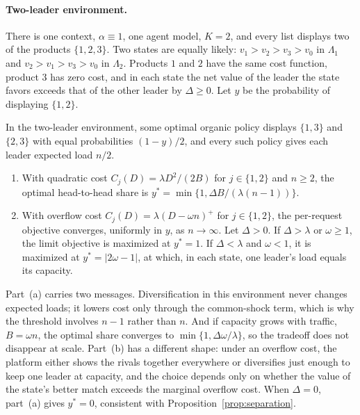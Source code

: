 \documentclass[opre,dblanonrev]{informs4}
\providecommand{\1}{\mathbf{1}}
\begin{document}
\paragraph{Two-leader environment.} There is one context, $\alpha\equiv1$, one agent model, $K=2$, and every list displays two of the products $\{1,2,3\}$. Two states are equally likely: $v_1>v_2>v_3>v_0$ in $\Lambda_1$ and $v_2>v_1>v_3>v_0$ in $\Lambda_2$. Products $1$ and $2$ have the same cost function, product $3$ has zero cost, and in each state the net value of the leader the state favors exceeds that of the other leader by $\Delta\ge0$. Let $y$ be the probability of displaying $\{1,2\}$.

\begin{proposition}\label{prop:threshold}
In the two-leader environment, some optimal organic policy displays $\{1,3\}$ and $\{2,3\}$ with equal probabilities $(1-y)/2$, and every such policy gives each leader expected load $n/2$.
\begin{enumerate}
\item[(a)] With quadratic cost $C_j(D)=\lambda D^2/(2B)$ for $j\in\{1,2\}$ and $n\ge2$, the optimal head-to-head share is $y^\ast=\min\{1,\Delta B/(\lambda(n-1))\}$.
\item[(b)] With overflow cost $C_j(D)=\lambda(D-\omega n)^+$ for $j\in\{1,2\}$, the per-request objective converges, uniformly in $y$, as $n\to\infty$. Let $\Delta>0$. If $\Delta>\lambda$ or $\omega\ge1$, the limit objective is maximized at $y^\ast=1$. If $\Delta<\lambda$ and $\omega<1$, it is maximized at $y^\ast=|2\omega-1|$, at which, in each state, one leader's load equals its capacity.
\end{enumerate}
\end{proposition}

Part~(a) carries two messages. Diversification in this environment never changes expected loads; it lowers cost only through the common-shock term, which is why the threshold involves $n-1$ rather than $n$. And if capacity grows with traffic, $B=\omega n$, the optimal share converges to $\min\{1,\Delta\omega/\lambda\}$, so the tradeoff does not disappear at scale. Part~(b) has a different shape: under an overflow cost, the platform either shows the rivals together everywhere or diversifies just enough to keep one leader at capacity, and the choice depends only on whether the value of the state's better match exceeds the marginal overflow cost. When $\Delta=0$, part~(a) gives $y^\ast=0$, consistent with Proposition~\ref{prop:separation}.
\end{document}
